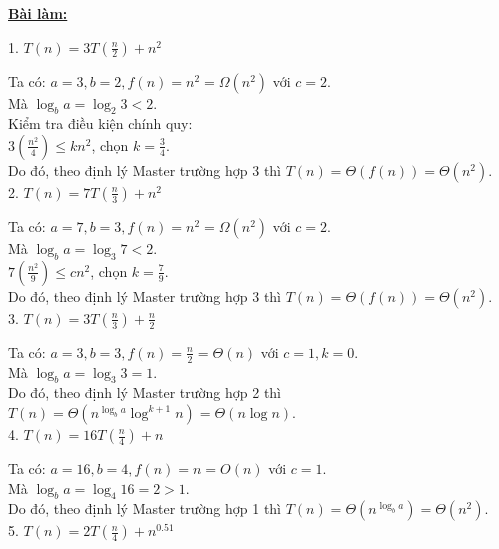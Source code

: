 \documentclass[12pt, a4paper, fleqn]{article}
\begin{document}
		\begin{center}
			\textbf{\underline{Bài làm:}}
		\end{center}
		
		1. $\displaystyle
		T(n) = 3T\left( \frac{n}{2} \right) + n^2$
		
		Ta có: $a = 3, b = 2, f(n) = n^2 = \Omega (n^2)$ với $c = 2$.\\
		Mà $\log_{b} a = \log_{2} 3 < 2$.\\
		Kiểm tra điều kiện chính quy:\\
		$\displaystyle
		3 \left( \frac{n^2}{4} \right)  \leq kn^2$, chọn $\displaystyle
		k = \frac{3}{4}$.\\
		Do đó, theo định lý Master trường hợp 3 thì $T(n) = \Theta (f(n)) = \Theta (n^2)$.
		\\
		
		2. $\displaystyle
		T(n) = 7T\left( \frac{n}{3} \right) + n^2$
		
		Ta có: $a = 7, b = 3, f(n) = n^2 = \Omega (n^2)$ với $c = 2$.\\
		Mà $\log_{b} a = \log_{3} 7 < 2$.\\
		$\displaystyle
		7 \left( \frac{n^2}{9} \right)  \leq cn^2$, chọn $\displaystyle
		k = \frac{7}{9}$.\\
		Do đó, theo định lý Master trường hợp 3 thì $T(n) = \Theta (f(n)) = \Theta (n^2)$.
		\\
		
		3. $\displaystyle
		T(n) = 3T\left( \frac{n}{3} \right) + \frac{n}{2}$
		
		Ta có: $a = 3, b = 3, f(n) = \displaystyle \frac{n}{2} = \Theta (n)$ với $c = 1, k = 0$.\\
		Mà $\log_{b} a = \log_{3} 3 = 1$.\\
		Do đó, theo định lý Master trường hợp 2 thì $T(n) = \Theta \left( n^{\log_{b} a} \log^{k + 1} n \right) = \Theta (n\log n)$.
		\\
		
			
		4. $\displaystyle
		T(n) = 16T\left( \frac{n}{4} \right) + n$
		
		Ta có: $a = 16, b = 4, f(n) = n = O(n)$ với $c = 1$.\\
		Mà $\log_{b} a = \log_{4} 16 = 2 > 1$.\\
		Do đó, theo định lý Master trường hợp 1 thì $T(n) = \Theta \left( n^{\log_{b} a} \right) = \Theta (n^2)$.
		\\
		
		
		5. $\displaystyle
		T(n) = 2T\left( \frac{n}{4} \right) + n^{0.51}$
		
\end{document}
